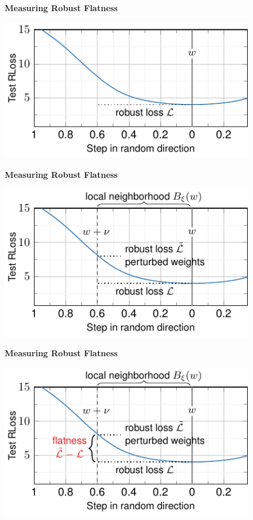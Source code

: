 \documentclass[64pt,aspectratio=169]{beamer}
\begin{document}
	\begin{frame}[t]{\bfseries Measuring Robust Flatness}
		\Large
		\vspace*{0.15cm}
		\begin{center}
			\includegraphics[width=11cm]{fig/main_illustration1.pdf}
		\end{center}
	\end{frame}
	
	\begin{frame}[t]{\bfseries Measuring Robust Flatness}
		\Large
		\vspace*{-0.5cm}
		\begin{center}
			\includegraphics[width=11cm]{fig/main_illustration1_2.pdf}
		\end{center}
	\end{frame}
		
	\begin{frame}[t]{\bfseries Measuring Robust Flatness}
		\Large
		\vspace*{-0.5cm}
		\begin{center}
			\includegraphics[width=11cm]{fig/main_illustration1_3.pdf}
		\end{center}
	\end{frame}
	
\end{document}
